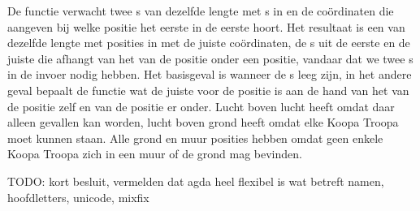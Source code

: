 De  functie verwacht twee s van dezelfde lengte
met s in en de coördinaten die aangeven bij welke positie het
eerste  in de eerste  hoort. Het resultaat is een
 van dezelfde lengte met posities in met de juiste coördinaten, de
s uit de eerste  en de juiste  die
afhangt van het  van de positie onder een positie, vandaar dat
we twee s in de invoer nodig hebben. Het basisgeval is wanneer de
s leeg zijn, in het andere geval bepaalt de functie 
wat de juiste  voor de positie is aan de hand van het
 van de positie zelf en van de positie er onder. Lucht boven
lucht heeft   omdat daar alleen gevallen kan
worden, lucht boven grond heeft   omdat elke Koopa
Troopa moet kunnen staan. Alle grond en muur posities hebben 
 omdat geen enkele Koopa Troopa zich in een muur of de grond
mag bevinden.

TODO: kort besluit, vermelden dat agda heel flexibel is wat betreft namen,
hoofdletters, unicode, mixfix
